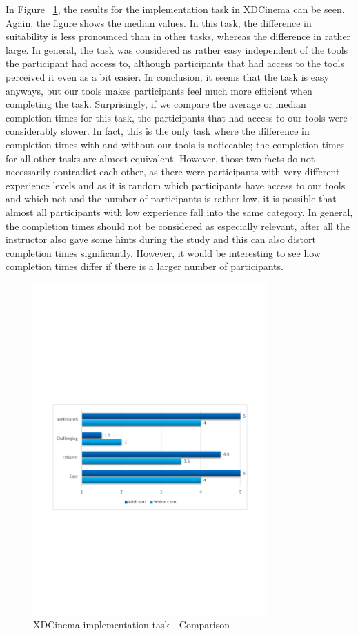 In Figure ~\ref{fig:xdc_impl_comparison}, the results for the implementation task in XDCinema can be seen. Again, the figure shows the median values. In this task, the difference in suitability is less pronounced than in other tasks, whereas the difference in rather large. In general, the task was considered as rather easy independent of the tools the participant had access to, although participants that had access to the tools perceived it even as a bit easier. In conclusion, it seems that the task is easy anyways, but our tools makes participants feel much more efficient when completing the task. Surprisingly, if we compare the average or median completion times for this task, the participants that had access to our tools were considerably slower. In fact, this is the only task where the difference in completion times with and without our tools is noticeable; the completion times for all other tasks are almost equivalent. However, those two facts do not necessarily contradict each other, as there were participants with very different experience levels and as it is random which participants have access to our tools and which not and the number of participants is rather low, it is possible that almost all participants with low experience fall into the same category. In general, the completion times should not be considered as especially relevant, after all the instructor also gave some hints during the study and this can also distort completion times significantly. However, it would be interesting to see how completion times differ if there is a larger number of participants. 

\begin{figure}[H]
  \centering
    \includegraphics[width=0.8\textwidth]{images/charts/xdc_impl_comparison.pdf}
	\caption{XDCinema implementation task - Comparison}
	\label{fig:xdc_impl_comparison}
\end{figure}

